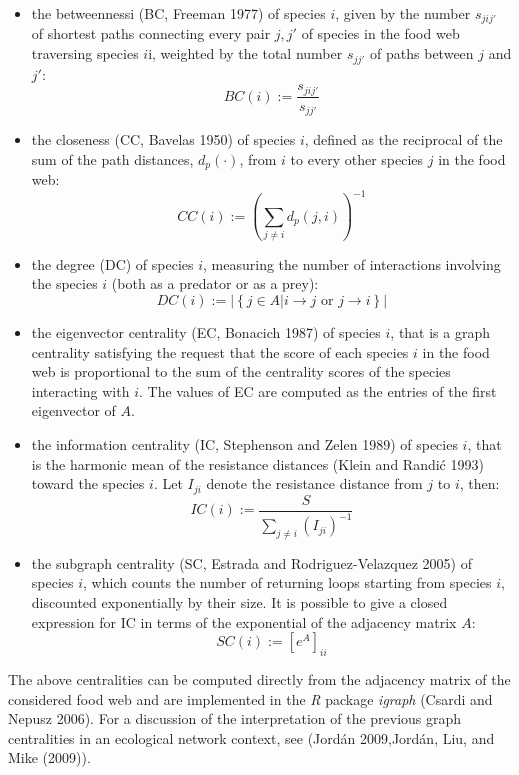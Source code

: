 \documentclass[11pt,article,oneside]{memoir}
\begin{document}
\begin{itemize}
\tightlist
\item
  the betweennessi (BC, Freeman 1977) of species \(i\), given by the
  number \(s_{jij'}\) of shortest paths connecting every pair \(j,j'\)
  of species in the food web traversing species \(i\)i, weighted by the
  total number \(s_{jj'}\) of paths between \(j\) and \(j'\):
  \[BC(i) := \frac{s_{jij'}}{s_{jj'}}\]
\item
  the closeness (CC, Bavelas 1950) of species \(i\), defined as the
  reciprocal of the sum of the path distances, \(d_p(\cdot)\), from
  \(i\) to every other species \(j\) in the food web:
  \[CC(i) := \left( \sum_{j \neq i} d_p(j,i)\right)^{-1}\]
\item
  the degree (DC) of species \(i\), measuring the number of interactions
  involving the species \(i\) (both as a predator or as a prey):
  \[DC(i) := |\left\{j \in A | i \to j \mbox{ or } j \to i \right\}|\]
\item
  the eigenvector centrality (EC, Bonacich 1987) of species \(i\), that
  is a graph centrality satisfying the request that the score of each
  species \(i\) in the food web is proportional to the sum of the
  centrality scores of the species interacting with \(i\). The values of
  EC are computed as the entries of the first eigenvector of \(A\).
\item
  the information centrality (IC, Stephenson and Zelen 1989) of species
  \(i\), that is the harmonic mean of the resistance distances (Klein
  and Randić 1993) toward the species \(i\). Let \(I_{ji}\) denote the
  resistance distance from \(j\) to \(i\), then:
  \[IC(i) := \frac{S}{\sum_{j \neq i}\left(I_{ji}\right)^{-1}}\]
\item
  the subgraph centrality (SC, Estrada and Rodriguez-Velazquez 2005) of
  species \(i\), which counts the number of returning loops starting
  from species \(i\), discounted exponentially by their size. It is
  possible to give a closed expression for IC in terms of the
  exponential of the adjacency matrix \(A\):
  \[SC(i) := \left[ e^A \right]_{ii}\]
\end{itemize}

The above centralities can be computed directly from the adjacency
matrix of the considered food web and are implemented in the \emph{R}
package \emph{igraph} (Csardi and Nepusz 2006). For a discussion of the
interpretation of the previous graph centralities in an ecological
network context, see (Jordán 2009,Jordán, Liu, and Mike (2009)).
\end{document}
